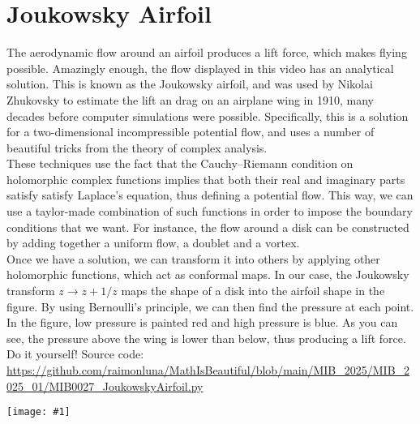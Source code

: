 \documentclass[12pt,landscape]{article}
\newcommand{\artpage}[3][]{%
  \begin{minipage}[t]{0.48\linewidth}
    \vspace{0pt} %
    \section*{#2} %
    \addcontentsline{toc}{section}{#2} %
    #3 %
  \end{minipage}%
  \hfill
  \begin{minipage}[t]{0.48\linewidth}
    \vspace{0pt} %
    \centering
    \texttt{[image: \#1]}
  \end{minipage}%
  \newpage
}
\begin{document}
\artpage[../Output/LowQuality/MIB0027_JoukowskyAirfoil.png]{Joukowsky Airfoil}{%
The aerodynamic flow around an airfoil produces a lift force, which makes flying possible. Amazingly enough, the flow displayed in this video has an analytical solution. This is known as the Joukowsky airfoil, and was used by Nikolai Zhukovsky to estimate the lift an drag on an airplane wing in 1910, many decades before computer simulations were possible. Specifically, this is a solution for a two-dimensional incompressible potential flow, and uses a number of beautiful tricks from the theory of complex analysis.\\

These techniques use the fact that the Cauchy–Riemann condition on holomorphic complex functions implies that both their real and imaginary parts satisfy satisfy Laplace's equation, thus defining a potential flow. This way, we can use a taylor-made combination of such functions in order to impose the boundary conditions that we want. For instance, the flow around a disk can be constructed by adding together a uniform flow, a doublet and a vortex.\\

Once we have a solution, we can transform it into others by applying other holomorphic functions, which act as conformal maps. In our case, the Joukowsky transform $z \to z + 1/z$ maps the shape of a disk into the airfoil shape in the figure. By using Bernoulli's principle, we can then find the pressure at each point. In the figure, low pressure is painted red and high pressure is blue. As you can see, the pressure above the wing is lower than below, thus producing a lift force.\\

Do it yourself! Source code: \url{https://github.com/raimonluna/MathIsBeautiful/blob/main/MIB_2025/MIB_2025_01/MIB0027_JoukowskyAirfoil.py}
}
\end{document}
